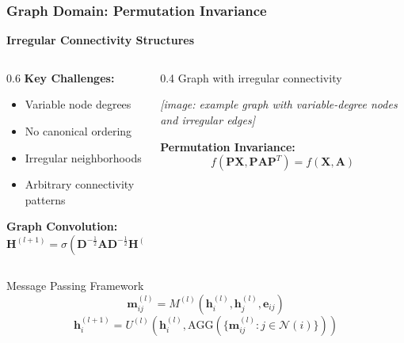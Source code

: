 \begin{frame}[fragile]\frametitle{Graph Domain: Permutation Invariance}

\begin{center}
\textbf{Irregular Connectivity Structures}
\end{center}

\begin{columns}
\begin{column}{0.6\textwidth}
\textbf{Key Challenges:}
\begin{itemize}
\item Variable node degrees
\item No canonical ordering
\item Irregular neighborhoods
\item Arbitrary connectivity patterns
\end{itemize}

\textbf{Graph Convolution:}
$$\mathbf{H}^{(l+1)} = \sigma\left(\mathbf{D}^{-\frac{1}{2}}\mathbf{A}\mathbf{D}^{-\frac{1}{2}}\mathbf{H}^{(l)}\mathbf{W}^{(l)}\right)$$


\end{column}
\begin{column}{0.4\textwidth}
{\small Graph with irregular connectivity}

\begin{center}
\textit{[image: example graph with variable-degree nodes and irregular edges]}
\end{center}

\textbf{Permutation Invariance:}
$$f(\mathbf{P}\mathbf{X}, \mathbf{P}\mathbf{A}\mathbf{P}^T) = f(\mathbf{X}, \mathbf{A})$$
\end{column}
\end{columns}

\begin{exampleblock}{Message Passing Framework}
$$\mathbf{m}_{ij}^{(l)} = M^{(l)}(\mathbf{h}_i^{(l)}, \mathbf{h}_j^{(l)}, \mathbf{e}_{ij})$$
$$\mathbf{h}_i^{(l+1)} = U^{(l)}\left(\mathbf{h}_i^{(l)}, \text{AGG}\left(\{\mathbf{m}_{ij}^{(l)} : j \in \mathcal{N}(i)\}\right)\right)$$
\end{exampleblock}

\end{frame}


